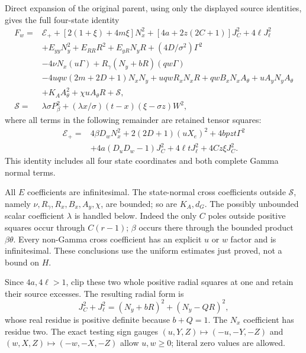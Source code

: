 \documentclass[10pt,a4paper]{article}
\begin{document}
Direct expansion of the original parent, using only the displayed source
identities, gives the full four-state identity
\begin{align}
 F_w={}&\mathcal E_++[2(1+\xi)+4m\xi]N_x^2
       +[4a+2z(2C+1)]J_C^2+4\ell J_\ell^2\nonumber\\
 &+E_{yy}N_y^2+E_{RR}R^2+E_{yR}N_yR
        +(4D/\sigma^2)\Gamma^2\nonumber\\
 &-4\nu N_x(u\Gamma)
       +R_\gamma(N_y+bR)(qw\Gamma)\nonumber\\
 &-4uqw(2m+2D+1)N_xN_y+uqwR_xN_xR
           +qwB_xN_xA_\theta+uA_yN_yA_\theta\nonumber\\
 &+K_AA_\theta^2+\chi uA_\theta R+\mathscr S,
 \label{eq:compression-full-parent}\tag{SP6}\\
 \mathscr S={}&\lambda\sigma P_\beta^2
       +(\lambda x/\sigma)(t-x)(\xi-\sigma z)W^2,\nonumber
\end{align}
where all terms in the following remainder are retained tensor squares:
\[
\begin{split}
 \mathcal E_+={}&4\beta D_wN_x^2+2(2D+1)(uX_e)^2
              +4bpzt\Gamma^2\\
 &+4a(D_uD_w-1)J_C^2+4\ell tJ_\ell^2+4Cz\xi J_C^2.
\end{split}
\]
This identity includes all four state coordinates and both complete Gamma normal terms.  


All $E$ coefficients are infinitesimal. The state-normal cross
coefficients outside $\mathscr S$, namely
$\nu,R_\gamma,R_x,B_x,A_y,\chi$, are bounded; so are $K_A,d_G$.
The possibly unbounded scalar coefficient $\lambda$ is handled below.
Indeed the only $C$ poles outside positive squares occur through
$C(r-1)$; $\beta$ occurs there through the bounded product
$\beta\theta$. Every non-Gamma cross coefficient has an explicit
$u$ or $w$ factor and is infinitesimal. These conclusions use the
uniform estimates just proved, not a bound on $H$.

Since $4a,4\ell>1$, clip these two whole positive radial squares at
one and retain their source excesses. The resulting radial form is
\[
 J_C^2+J_\ell^2=(N_y+bR)^2+(N_y-QR)^2,
\]
whose real residue is positive definite because $b+Q=1$.
The $N_x$ coefficient has residue two. The exact testing sign gauges
$(u,Y,Z)\mapsto(-u,-Y,-Z)$ and $(w,X,Z)\mapsto(-w,-X,-Z)$
allow $u,w\ge0$; literal zero values are allowed.
\end{document}
